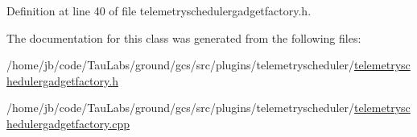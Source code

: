 \-Definition at line 40 of file telemetryschedulergadgetfactory.\-h.



\-The documentation for this class was generated from the following files\-:\begin{DoxyCompactItemize}
\item 
/home/jb/code/\-Tau\-Labs/ground/gcs/src/plugins/telemetryscheduler/\hyperlink{telemetryschedulergadgetfactory_8h}{telemetryschedulergadgetfactory.\-h}\item 
/home/jb/code/\-Tau\-Labs/ground/gcs/src/plugins/telemetryscheduler/\hyperlink{telemetryschedulergadgetfactory_8cpp}{telemetryschedulergadgetfactory.\-cpp}\end{DoxyCompactItemize}
